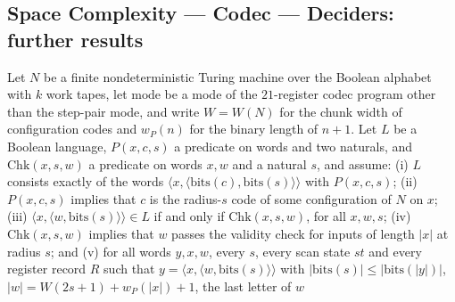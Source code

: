 \subsection*{Space Complexity --- Codec --- Deciders: further results}

\begin{theorem}
\label{Complexity.Codec.oneCode_mem}
\leanok
{}
Let $N$ be a finite nondeterministic Turing machine over the Boolean alphabet with $k$ work
tapes, let $\mathrm{mode}$ be a mode of the $21$-register codec program other than the
step-pair mode, and write $W=W(N)$ for the chunk width of configuration codes and $w_P(n)$ for
the binary length of $n+1$. Let $L$ be a Boolean language, $P(x,c,s)$ a predicate on words and
two naturals, and $\mathrm{Chk}(x,s,w)$ a predicate on words $x,w$ and a natural $s$, and
assume: (i) $L$ consists exactly of the words
$\langle x,\langle\mathrm{bits}(c),\mathrm{bits}(s)\rangle\rangle$ with $P(x,c,s)$;
(ii) $P(x,c,s)$ implies that $c$ is the radius-$s$ code of some configuration of $N$ on $x$;
(iii) $\langle x,\langle w,\mathrm{bits}(s)\rangle\rangle\in L$ if and only if
$\mathrm{Chk}(x,s,w)$, for all $x,w,s$; (iv) $\mathrm{Chk}(x,s,w)$ implies that $w$ passes the
validity check for inputs of length $|x|$ at radius $s$; and (v) for all words $y,x,w$, every
$s$, every scan state $st$ and every register record $R$ such that
$y=\langle x,\langle w,\mathrm{bits}(s)\rangle\rangle$ with
$|\mathrm{bits}(s)|\le|\mathrm{bits}(|y|)|$, $|w|=W(2s+1)+w_P(|x|)+1$, the last letter of $w$

\end{theorem}
